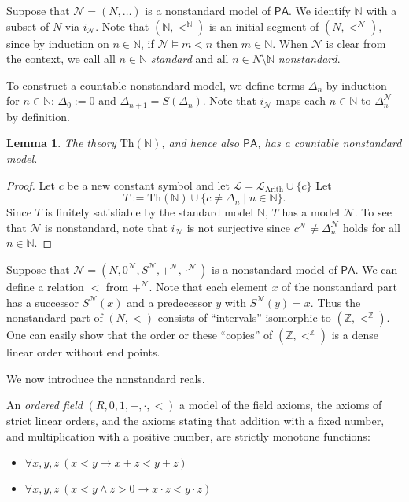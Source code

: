 \documentclass[a4paper, 11pt]{amsart}
\newtheorem{lemma}[lemma]{Lemma}
\theoremstyle{remark}
\newcommand{\axiomft}[1]{\mathsf{#1}}
\newcommand{\PA}{\axiomft{PA}}
\newcommand{\NN}{\mathbb{N}}
\newcommand{\ZZ}{\mathbb{Z}}
\newcommand{\Th}{\mathrm{Th}}
\newcommand{\cL}{\mathcal L}
\newcommand{\cN}{\mathcal N}
\begin{document}
Suppose that $\cN=(N,\dots)$ is a nonstandard model of $\PA$. 
We identify $\NN$ with a subset of $N$ via $i_\cN$. 
Note that $(\NN,<^\NN)$ is an initial segment of $(N,<^\cN)$, since by induction on $n\in\NN$,  if $\cN \models m<n$ then $m\in \NN$. 
When $\cN$ is clear from the context, we call all $n\in \NN$ \emph{standard} and all $n\in N \setminus \NN$ \emph{nonstandard}. 

To construct a countable nonstandard model, we define terms $\Delta_{n}$ by induction for $n\in \NN$: 
$\Delta_0:=0$ and $\Delta_{n+1}=S(\Delta_{n})$. 
Note that $i_\cN$ maps each $n\in \NN$ to $\Delta_n^\cN$ by definition. 

\begin{lemma} 
The theory $\Th(\NN)$, and hence also $\PA$, has a countable nonstandard model. 
\end{lemma} 
\begin{proof} 
Let $c$ be a new constant symbol and let $\cL=\cL_{\mathrm{Arith}}\cup\{c\}$ 
Let 
$$ T:=   \Th(\NN)\cup \{ c\neq \Delta_{n} \mid  n\in\NN \}. $$ 
Since $T$ is finitely satisfiable by the standard model $\NN$, $T$ has a model $\cN$. 
To see that $\cN$ is nonstandard, note that $i_\cN$ is not surjective since $c^\cN\neq \Delta_{n}^\cN$ holds for all $n\in\NN$. 
\end{proof} 

Suppose that $\cN=(N,0^\cN,S^\cN,+^\cN,\cdot^\cN)$ is a nonstandard model of $\PA$. 
We can define a relation $<$ from $+^\cN$. 
Note that each element $x$ of the nonstandard part has a successor $S^\cN(x)$ and a predecessor $y$ with $S^\cN(y)=x$. 
Thus the nonstandard part of $(N,<)$ consists of ``intervals'' isomorphic to $(\ZZ,<^\ZZ)$. 
One can easily show that the order or these ``copies'' of  $(\ZZ,<^\ZZ)$ is a dense linear order without end points. 





We now introduce the nonstandard reals. 

An \emph{ordered field} $(R,0,1,+,\cdot,<)$ a model of the field axioms, the axioms of strict linear orders, and the axioms stating that addition with a fixed number, and multiplication with a positive number, are strictly monotone functions: 

\begin{itemize} 
\item 
$\forall x,y,z\ (x<y \rightarrow x+z < y+z)$ 
\item 
$\forall x,y,z\ (x<y \wedge z>0 \rightarrow x\cdot z < y \cdot z)$ 
\end{itemize} 
\end{document}
